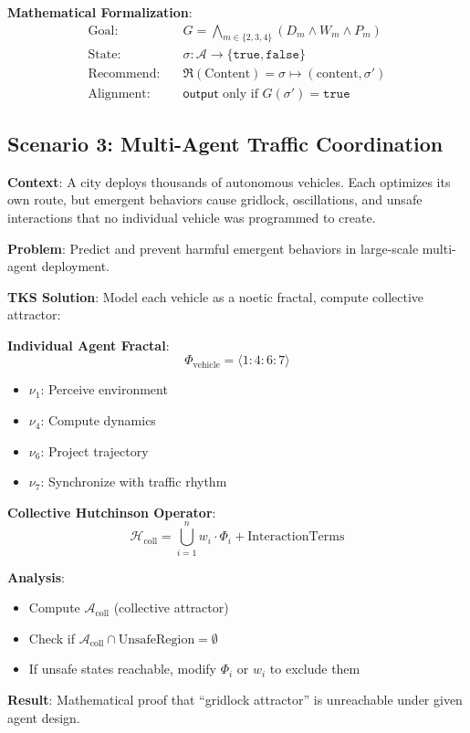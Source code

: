 \documentclass[11pt,twoside]{article}
\theoremstyle{definition}
\theoremstyle{plain}
\theoremstyle{remark}
\newcommand{\Acquisitions}{\mathcal{A}}
\newcommand{\noe}[1]{\nu_{#1}}
\newcommand{\RPM}{\mathfrak{R}}
\newcommand{\Frac}{\Phi}
\newcommand{\CollHutch}{\mathcal{H}_{\mathrm{coll}}}
\begin{document}
\textbf{Mathematical Formalization}:
\begin{equation}
\boxed{
\begin{aligned}
\text{Goal}: & \quad G = \bigwedge_{m \in \{2,3,4\}} (D_m \wedge W_m \wedge P_m) \\
\text{State}: & \quad \sigma : \Acquisitions \to \{\mathtt{true}, \mathtt{false}\} \\
\text{Recommend}: & \quad \RPM(\text{Content}) = \sigma \mapsto (\text{content}, \sigma') \\
\text{Alignment}: & \quad \mathsf{output} \text{ only if } G(\sigma') = \mathtt{true}
\end{aligned}
}
\end{equation}

\subsection{Scenario 3: Multi-Agent Traffic Coordination}

\begin{tcolorbox}[colback=yellow!10!white,colframe=orange!75!black,title=\textbf{Scenario: Autonomous Vehicle Coordination}]
\textbf{Context}: A city deploys thousands of autonomous vehicles. Each optimizes
its own route, but emergent behaviors cause gridlock, oscillations, and unsafe
interactions that no individual vehicle was programmed to create.

\textbf{Problem}: Predict and prevent harmful emergent behaviors in large-scale
multi-agent deployment.

\textbf{TKS Solution}: Model each vehicle as a noetic fractal, compute collective
attractor:

\textbf{Individual Agent Fractal}:
\[
\Frac_{\mathrm{vehicle}} = \langle 1 : 4 : 6 : 7 \rangle
\]
\begin{itemize}
  \item $\noe{1}$: Perceive environment
  \item $\noe{4}$: Compute dynamics
  \item $\noe{6}$: Project trajectory
  \item $\noe{7}$: Synchronize with traffic rhythm
\end{itemize}

\textbf{Collective Hutchinson Operator}:
\[
\CollHutch = \bigcup_{i=1}^{n} w_i \cdot \Frac_i + \text{InteractionTerms}
\]

\textbf{Analysis}:
\begin{itemize}
  \item Compute $\mathcal{A}_{\mathrm{coll}}$ (collective attractor)
  \item Check if $\mathcal{A}_{\mathrm{coll}} \cap \text{UnsafeRegion} = \emptyset$
  \item If unsafe states reachable, modify $\Frac_i$ or $w_i$ to exclude them
\end{itemize}

\textbf{Result}: Mathematical proof that ``gridlock attractor'' is unreachable
under given agent design.
\end{tcolorbox}
\end{document}
